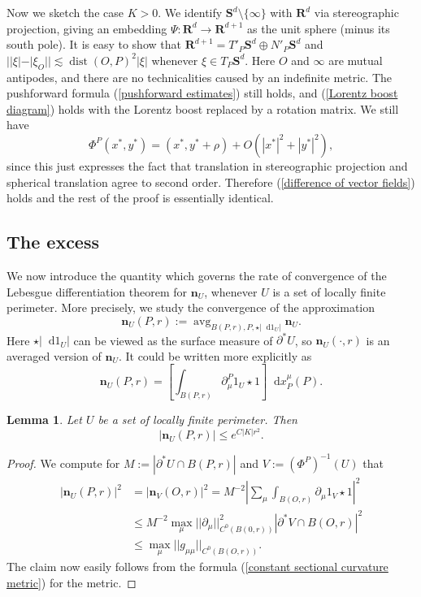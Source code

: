 \documentclass[reqno,11pt]{amsart}
\newcommand{\RR}{\mathbf{R}}
\newcommand{\Sph}{\mathbf S}
\DeclareMathOperator{\avg}{avg}
\newcommand*\dif{\mathop{}\!\mathrm{d}}
\DeclareMathOperator{\dist}{dist}
\newcommand{\normal}{\mathbf n}
\newtheorem{lemma}[theorem]{Lemma}
\theoremstyle{definition}
\numberwithin{equation}{section}
\begin{document}
Now we sketch the case $K > 0$.
We identify $\Sph^d \setminus \{\infty\}$ with $\RR^d$ via stereographic projection, giving an embedding $\Psi: \RR^d \to \RR^{d + 1}$ as the unit sphere (minus its south pole).
It is easy to show that $\RR^{d + 1} = T'_P \Sph^d \oplus N'_P \Sph^d$ and $||\xi| - |\xi_O|| \lesssim \dist(O, P)^2 |\xi|$ whenever $\xi \in T_P \Sph^d$.
Here $O$ and $\infty$ are mutual antipodes, and there are no technicalities caused by an indefinite metric.
The pushforward formula (\ref{pushforward estimates}) still holds, and (\ref{Lorentz boost diagram}) holds with the Lorentz boost replaced by a rotation matrix.
We still have
$$\Phi^P(x^*, y^*) = (x^*, y^* + \rho) + O(|x^*|^2 + |y^*|^2),$$
since this just expresses the fact that translation in stereographic projection and spherical translation agree to second order.
Therefore (\ref{difference of vector fields}) holds and the rest of the proof is essentially identical.


\subsection{The excess}
We now introduce the quantity which governs the rate of convergence of the Lebesgue differentiation theorem for $\normal_U$, whenever $U$ is a set of locally finite perimeter.
More precisely, we study the convergence of the approximation
$$\normal_U(P, r) := \avg_{B(P, r), P, \star |\dif 1_U|} \normal_U.$$
Here $\star |\dif 1_U|$ can be viewed as the surface measure of $\partial^* U$, so $\normal_U(\cdot, r)$ is an averaged version of $\normal_U$.
It could be written more explicitly as
$$\normal_U(P, r) = \left[\int_{B(P, r)} \partial_\mu^P 1_U \star 1\right] \dif x_P^\mu(P).$$

\begin{lemma}\label{gauge invariance of the normal}
Let $U$ be a set of locally finite perimeter. Then
$$|\normal_U(P, r)| \leq e^{C|K|r^2}.$$
\end{lemma}
\begin{proof}
We compute for $M := |\partial^* U \cap B(P, r)|$ and $V := (\Phi^P)^{-1}(U)$ that
\begin{align*}
|\normal_U(P, r)|^2 &= |\normal_V(O, r)|^2 = M^{-2} \left|\sum_\mu \int_{B(O, r)} \partial_\mu 1_V \star 1\right|^2 \\
&\leq M^{-2} \max_\mu ||\partial_\mu||_{C^0(B(0, r))}^2 |\partial^* V \cap B(O, r)|^2 \\
&\leq \max_\mu ||g_{\mu\mu}||_{C^0(B(O, r))}.
\end{align*}
The claim now easily follows from the formula (\ref{constant sectional curvature metric}) for the metric.
\end{proof}
\end{document}
